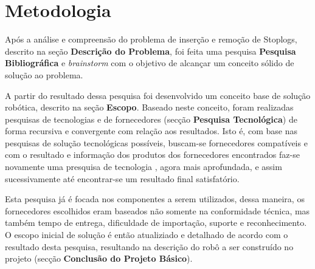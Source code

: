 


\section{Metodologia}

Após a análise e compreensão do problema de inserção e remoção de Stoplogs, descrito na seção \textbf{Descrição do Problema}, foi feita uma pesquisa
\textbf{Pesquisa Bibliográfica} e \emph{brainstorm} com o objetivo de alcançar um conceito sólido de solução ao problema. 

A partir do resultado dessa pesquisa foi desenvolvido um conceito base de solução robótica, descrito na seção {\bf Escopo}. 
Baseado neste conceito, foram realizadas pesquisas de tecnologias e de fornecedores (secção  {\bf Pesquisa Tecnológica}) de forma recursiva e convergente com relação aos resultados. Isto
é, com base nas pesquisas de solução tecnológicas possíveis, buscam-se fornecedores compatíveis e com o
resultado e informação dos produtos dos fornecedores encontrados faz-se
novamente uma presquisa de tecnologia	, agora mais aprofundada, e assim sucessivamente
até encontrar-se um resultado final satisfatório. 

Esta pesquisa já é focada nos
componentes a serem utilizados, dessa maneira, os fornecedores escolhidos eram
baseados não somente na conformidade técnica, mas também tempo de entrega,
dificuldade de importação, suporte e reconhecimento. O escopo inicial de solução
é então atualiziado e detalhado de acordo com o resultado desta pesquisa, resultando na descrição do robô a ser construído no projeto (secção {\bf Conclusão do Projeto Básico}).



